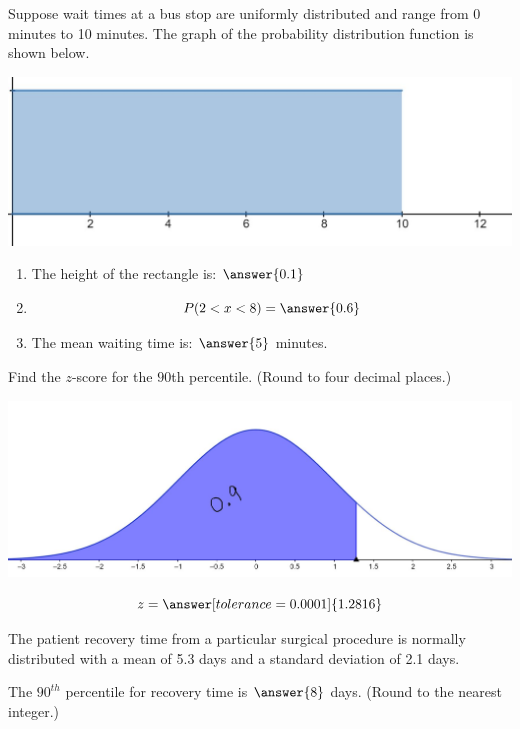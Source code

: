 \documentclass{ximera}
\begin{document}
\begin{problem}\label{prob:exam2prob5}
Suppose wait times at a bus stop are uniformly distributed and range from 0 minutes to 10 minutes.  The graph of the probability distribution function is shown below.
\begin{image}
\includegraphics{test2waittime.JPG}
\end{image}
\begin{enumerate}
    \item The height of the rectangle is: $\answer{0.1}$
    \item 
    $$P(2<x<8)=\answer{0.6}$$
    \item 
    The mean waiting time is: $\answer{5}$ minutes.
\end{enumerate}
\end{problem}

\begin{problem}\label{prob:exam2prob6}
Find the $z$-score for the $90$th percentile.  (Round to four decimal places.)
\begin{image}
\includegraphics{test290thpercentile.JPG}
\end{image}
$$z=\answer[tolerance=0.0001]{1.2816}$$
\end{problem}

\begin{problem}\label{prob:exam2prob7}
The patient recovery time from a particular surgical
procedure is normally distributed with a mean of 5.3 days and a standard deviation of 2.1 days.  

The $90^{th}$ percentile for recovery time is $\answer{8}$ days. (Round to the nearest integer.)
\end{problem}
\end{document}
